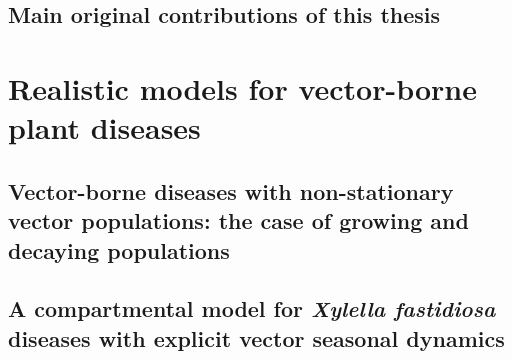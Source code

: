 \documentclass[
	10pt, %
	fleqn, %
	a4paper, %
]{LegrandOrangeBook}
\begin{document}
\chapter{Main original contributions of this thesis}
%


\part{Realistic models for vector-borne plant diseases}

\chapterspaceabove{6.75cm}
\chapterspacebelow{7.25cm}

\chapter{Vector-borne diseases with non-stationary vector populations: the case
  of growing and decaying populations}
%

\chapterspaceabove{6.75cm}
\chapterspacebelow{7.25cm}

\chapter{A compartmental model for \textit{Xylella fastidiosa} diseases with
  explicit vector seasonal dynamics}
%

\chapterspaceabove{6.75cm}
\chapterspacebelow{7.25cm}
\end{document}
